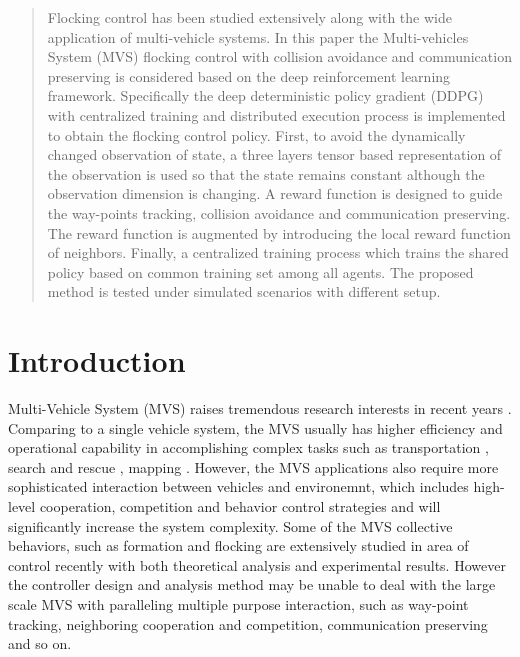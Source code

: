\documentclass[letterpaper,10 pt,conference]{ieeeconf}
\begin{document}
\maketitle
\begin{abstract}
	Flocking control has been studied extensively along with the wide application  of multi-vehicle systems. In this paper the Multi-vehicles System (MVS) flocking control with collision avoidance and communication preserving is considered based on the deep reinforcement learning framework. Specifically the deep deterministic policy gradient (DDPG) with centralized training and distributed execution process is implemented to obtain the flocking control policy. First, to avoid the dynamically changed observation of state, a three layers tensor based representation of the observation is used so that the state remains constant although the observation dimension is changing. A reward function is designed to guide the way-points tracking, collision avoidance and communication preserving. The reward function is augmented by introducing the local reward function of neighbors. Finally, a centralized training process which trains the shared policy based on common training set among all agents. The proposed method is tested under simulated scenarios with different setup.
\end{abstract}
\section{Introduction}
Multi-Vehicle System  (MVS) raises tremendous research interests in recent years \cite{4140748}. 
Comparing to a single vehicle system, the MVS usually has higher efficiency and operational capability in accomplishing complex tasks such as transportation \cite{alonso2017multi}, search and rescue \cite{liu2016multirobot}, mapping \cite{liu2016towards}. However, the MVS applications also require more sophisticated interaction between vehicles and environemnt, which includes high-level cooperation, competition and behavior control strategies and will significantly increase the system complexity. 
Some of the MVS collective behaviors, such as formation \cite{beard2001coordination} and flocking \cite{olfati2006flocking} are extensively studied in area of control recently with both theoretical analysis and experimental results. However the controller design and analysis method may be unable to deal with the large scale MVS with paralleling multiple purpose interaction, such as way-point tracking, neighboring cooperation and competition, communication preserving and so on.
\end{document}
